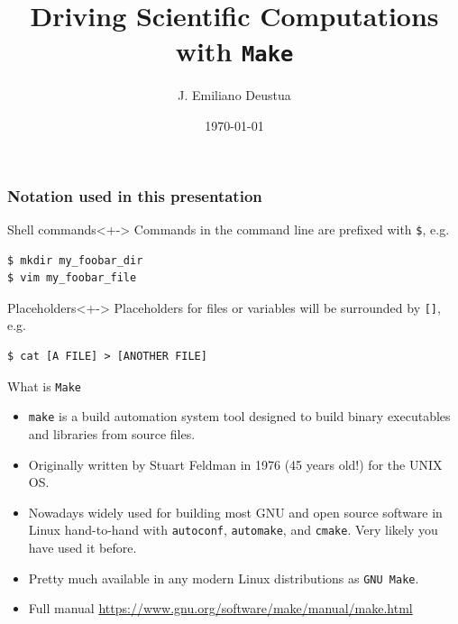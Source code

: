 \documentclass[10pt]{beamer}
\title{Driving Scientific Computations with \texttt{Make}}
\date{\today}
\author{J. Emiliano Deustua}
\institute{Miller's Group \\ Caltech \vspace{3ex}
  \\ {\tiny \url{https://gitlab.msu.edu/piecuch-group}}}
\newcommand{\textco}[1]{\colorbox{bg_gray}{\texttt{#1}}}
\begin{document}
  \maketitle

  \begin{frame}[fragile]
    \frametitle{Notation used in this presentation}
    \begin{block}{Shell commands}<+->
      Commands in the command line are prefixed with \texttt{\$}, e.g.
\begin{lstlisting}[numbers=none,backgroundcolor=\color{gray!10}]
$ mkdir my_foobar_dir
$ vim my_foobar_file
\end{lstlisting}
    \end{block}

    \begin{block}{Placeholders}<+->
      Placeholders for files or variables will be surrounded by \texttt{[]}, e.g.
\begin{lstlisting}[numbers=none,backgroundcolor=\color{gray!10}]
$ cat [A FILE] > [ANOTHER FILE]
\end{lstlisting}
    \end{block}
  \end{frame}


  \begin{frame}{What is \texttt{Make}}
    \begin{itemize}[<+->]
    \item \textco{make} is a \alert{build automation system tool} designed to build
      binary executables and libraries from source files.

    \item Originally written by Stuart Feldman in 1976 (\alert{45 years old!}) for the UNIX OS.

    \item Nowadays widely used for building most GNU and open source software
      in Linux hand-to-hand with \textco{autoconf}, \textco{automake}, and
      \textco{cmake}. \alert{Very likely you have used it before.}

    \item Pretty much available in any modern Linux
      distributions as \textco{GNU Make}.

    \item Full manual
      \url{https://www.gnu.org/software/make/manual/make.html}
  \end{itemize}
  \visible<+->{
    \begin{center}
    \textco{\$ make [TARGET]}
  \end{center}
}
  \end{frame}
\end{document}
